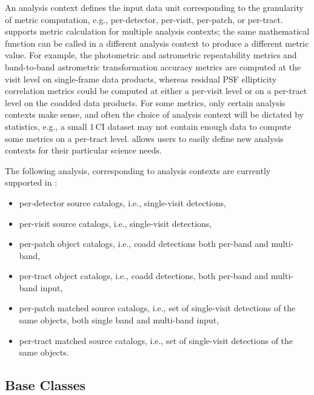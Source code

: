 An analysis context defines the input data unit corresponding to the granularity of metric computation, e.g., per-detector, per-visit, per-patch, or per-tract.
\faro supports metric calculation for multiple analysis contexts; the same mathematical function can be called in a different analysis context to produce a different metric value.
For example, the photometric and astrometric repeatability metrics and band-to-band astrometric transformation accuracy metrics are computed at the visit level on single-frame data products, whereas residual PSF ellipticity correlation metrics could be computed at either a per-visit level or on a per-tract level on the coadded data products.
For some metrics, only certain analysis contexts make sense, and often the choice of analysis context will be dictated by statistics, e.g., a small 1\,\degsq CI dataset may not contain enough data to compute some metrics on a per-tract level.
\faro allows users to easily define new analysis contexts for their particular science needs.


The following analysis, corresponding to analysis contexts are currently supported in \faro:
\begin{itemize}
\item per-detector source catalogs, i.e., single-visit detections,
\item per-visit source catalogs, i.e., single-visit detections,
\item per-patch object catalogs, i.e., coadd detections both per-band and multi-band,
\item per-tract object catalogs, i.e., coadd detections, both per-band and multi-band input,
\item per-patch matched source catalogs, i.e., set of single-visit detections of the same objects, both single band and multi-band input,
\item per-tract matched source catalogs, i.e., set of single-visit detections of the same objects.
\end{itemize}

\subsection{Base Classes} \label{ssec:base_classes}

